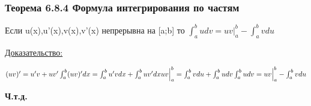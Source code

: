 \documentclass[12pt]{article}
\begin{document}
    \subsubsection*{Теорема 6.8.4 Формула интегрирования по частям}\label{th:6.8.4}
    Если u(x),u'(x),v(x),v'(x) непрерывна на [a;b] то $\int_{a}^{b} udv = uv \Big|^b_a-\int_{a}^{b}vdu$\par\noindent
    \underline{Доказательство:}
    \begin{adjustwidth}{1.5em}{1.5em}
        $(uv)'=u'v+uv'\\ \int_{a}^{b} (uv)'dx=\int_{a}^{b} u'v dx+\int_{a}^{b}uv'dx\\ uv \Big|^b_a=\int_{a}^{b}vdu + \int_{a}^{b} udv\\
        \int_{a}^{b}udv=uv\Big|^b_a-\int_{a}^{b} vdu$
    \end{adjustwidth}
    \begin{center}
        \textbf{Ч.т.д.}
    \end{center}
\end{document}
